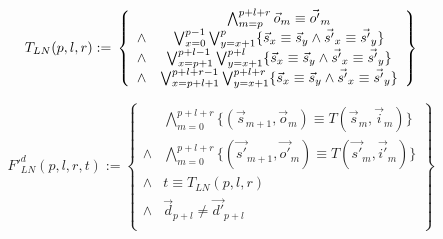 \begin{equation}\label{tln}
T_{LN}(p,l,r):=\\
\left\{
\begin{array}{cc}
      &\bigwedge_{m=p}^{p+l+r}\vec{o}_m\equiv \vec{o'}_m \\
\wedge&\bigvee_{x=0}^{p-1}\bigvee_{y=x+1}^{p} \{\vec{s}_x\equiv \vec{s}_y\wedge \vec{s'}_x\equiv \vec{s'}_y\} \\
\wedge&\bigvee_{x=p+1}^{p+l-1}\bigvee_{y=x+1}^{p+l} \{\vec{s}_x\equiv \vec{s}_y\wedge \vec{s'}_x\equiv \vec{s'}_y\} \\
\wedge&\bigvee_{x=p+l+1}^{p+l+r-1}\bigvee_{y=x+1}^{p+l+r} \{\vec{s}_x\equiv \vec{s}_y\wedge \vec{s'}_x\equiv \vec{s'}_y\}
\end{array}
\right\}
\end{equation}


\begin{equation}\label{lndef1}
F'^d_{LN}(p,l,r,t):=
\left\{
\begin{array}{cc}
&\bigwedge_{m=0}^{p+l+r}
\{
(\vec{s}_{m+1},\vec{o}_m)\equiv T(\vec{s}_m,\vec{i}_m)
\}
\\
\wedge&\bigwedge_{m=0}^{p+l+r}
\{
(\vec{s'}_{m+1},\vec{o'}_m)\equiv T(\vec{s'}_m,\vec{i'}_m)
\}
\\
\wedge& t\equiv T_{LN}(p,l,r)\\
\wedge& \vec{d}_{p+l}\ne \vec{d'}_{p+l} \\
\end{array}
\right\}
\end{equation}


